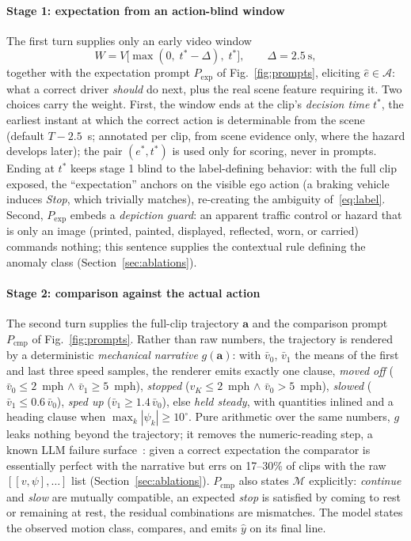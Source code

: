 \documentclass[conference]{IEEEtran}
\newcommand{\act}{\boldsymbol{a}}          %
\newcommand{\Acal}{\mathcal{A}}            %
\newcommand{\Mcal}{\mathcal{M}}            %
\begin{document}
\paragraph{Stage 1: expectation from an action-blind window} The first turn supplies only an early video window
\begin{equation}
W = V\big[\max(0,\; t^* - \Delta),\; t^*\big], \qquad \Delta = 2.5~\mathrm{s},\label{eq:window}
\end{equation}
together with the expectation prompt $P_{\mathrm{exp}}$ of Fig.~\ref{fig:prompts}, eliciting $\hat{e} \in \Acal$: what a correct driver \emph{should} do next, plus the real scene feature requiring it. Two choices carry the weight. First, the window ends at the clip's \emph{decision time} $t^*$, the earliest instant at which the correct action is determinable from the scene (default $T - 2.5$~s; annotated per clip, from scene evidence only, where the hazard develops later); the pair $(e^*, t^*)$ is used only for scoring, never in prompts. Ending at $t^*$ keeps stage 1 blind to the label-defining behavior: with the full clip exposed, the ``expectation'' anchors on the visible ego action (a braking vehicle induces \emph{Stop}, which trivially matches), re-creating the ambiguity of~\eqref{eq:label}. Second, $P_{\mathrm{exp}}$ embeds a \emph{depiction guard}: an apparent traffic control or hazard that is only an image (printed, painted, displayed, reflected, worn, or carried) commands nothing; this sentence supplies the contextual rule defining the anomaly class (Section~\ref{sec:ablations}).

\paragraph{Stage 2: comparison against the actual action} The second turn supplies the full-clip trajectory $\act$ and the comparison prompt $P_{\mathrm{cmp}}$ of Fig.~\ref{fig:prompts}. Rather than raw numbers, the trajectory is rendered by a deterministic \emph{mechanical narrative} $g(\act)$: with $\bar{v}_0$, $\bar{v}_1$ the means of the first and last three speed samples, the renderer emits exactly one clause, \emph{moved off} ($\bar{v}_0 \leq 2$~mph $\wedge$ $\bar{v}_1 \geq 5$~mph), \emph{stopped} ($v_K \leq 2$~mph $\wedge$ $\bar{v}_0 > 5$~mph), \emph{slowed} ($\bar{v}_1 \leq 0.6\,\bar{v}_0$), \emph{sped up} ($\bar{v}_1 \geq 1.4\,\bar{v}_0$), else \emph{held steady}, with quantities inlined and a heading clause when $\max_k |\psi_k| \geq 10^{\circ}$. Pure arithmetic over the same numbers, $g$ leaks nothing beyond the trajectory; it removes the numeric-reading step, a known LLM failure surface~\cite{b35,b36}: given a correct expectation the comparator is essentially perfect with the narrative but errs on 17--30\% of clips with the raw $[[v, \psi], \dots]$ list (Section~\ref{sec:ablations}). $P_{\mathrm{cmp}}$ also states $\Mcal$ explicitly: \emph{continue} and \emph{slow} are mutually compatible, an expected \emph{stop} is satisfied by coming to rest or remaining at rest, the residual combinations are mismatches. The model states the observed motion class, compares, and emits $\hat{y}$ on its final line.
\end{document}

